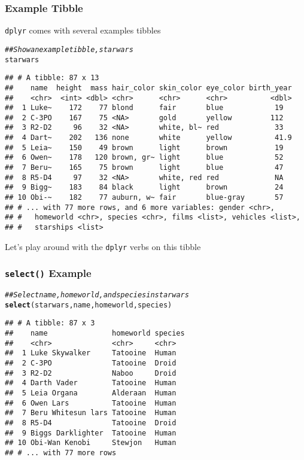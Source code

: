 \documentclass{beamer}\usepackage[]{graphicx}\usepackage[]{color}
\makeatletter
\newcommand{\hlcom}[1]{\textcolor[rgb]{0.678,0.584,0.686}{\textit{#1}}}%
\newcommand{\hlstd}[1]{\textcolor[rgb]{0.345,0.345,0.345}{#1}}%
\newcommand{\hlkwd}[1]{\textcolor[rgb]{0.737,0.353,0.396}{\textbf{#1}}}%
\newenvironment{kframe}{%
 \def\at@end@of@kframe{}%
 \ifinner\ifhmode%
  \def\at@end@of@kframe{\end{minipage}}%
  \begin{minipage}{\columnwidth}%
 \fi\fi%
 \def\FrameCommand##1{\hskip\@totalleftmargin \hskip-\fboxsep
 \colorbox{shadecolor}{##1}\hskip-\fboxsep
     \hskip-\linewidth \hskip-\@totalleftmargin \hskip\columnwidth}%
 \MakeFramed {\advance\hsize-\width
   \@totalleftmargin\z@ \linewidth\hsize
   \@setminipage}}%
 {\par\unskip\endMakeFramed%
 \at@end@of@kframe}
\newenvironment{knitrout}{}{} %
\makeatother
\begin{document}
\begin{frame}[fragile]\frametitle{Example Tibble}
    \texttt{dplyr} comes with several examples tibbles
\begin{knitrout}\footnotesize
{}\color{fgcolor}\begin{kframe}
\begin{alltt}
\hlcom{## Show an example tibble, starwars}
\hlstd{starwars}
\end{alltt}
\begin{verbatim}
## # A tibble: 87 x 13
##    name  height  mass hair_color skin_color eye_color birth_year
##    <chr>  <int> <dbl> <chr>      <chr>      <chr>          <dbl>
##  1 Luke~    172    77 blond      fair       blue            19  
##  2 C-3PO    167    75 <NA>       gold       yellow         112  
##  3 R2-D2     96    32 <NA>       white, bl~ red             33  
##  4 Dart~    202   136 none       white      yellow          41.9
##  5 Leia~    150    49 brown      light      brown           19  
##  6 Owen~    178   120 brown, gr~ light      blue            52  
##  7 Beru~    165    75 brown      light      blue            47  
##  8 R5-D4     97    32 <NA>       white, red red             NA  
##  9 Bigg~    183    84 black      light      brown           24  
## 10 Obi-~    182    77 auburn, w~ fair       blue-gray       57  
## # ... with 77 more rows, and 6 more variables: gender <chr>,
## #   homeworld <chr>, species <chr>, films <list>, vehicles <list>,
## #   starships <list>
\end{verbatim}
\end{kframe}
\end{knitrout}
    \vspace{1ex}
    Let's play around with the \texttt{dplyr} verbs on this tibble
\end{frame}

\begin{frame}[fragile]\frametitle{\texttt{select()} Example}
\begin{knitrout}\footnotesize
{}\color{fgcolor}\begin{kframe}
\begin{alltt}
\hlcom{## Select name, homeworld, and species in starwars}
\hlkwd{select}\hlstd{(starwars, name, homeworld, species)}
\end{alltt}
\begin{verbatim}
## # A tibble: 87 x 3
##    name               homeworld species
##    <chr>              <chr>     <chr>  
##  1 Luke Skywalker     Tatooine  Human  
##  2 C-3PO              Tatooine  Droid  
##  3 R2-D2              Naboo     Droid  
##  4 Darth Vader        Tatooine  Human  
##  5 Leia Organa        Alderaan  Human  
##  6 Owen Lars          Tatooine  Human  
##  7 Beru Whitesun lars Tatooine  Human  
##  8 R5-D4              Tatooine  Droid  
##  9 Biggs Darklighter  Tatooine  Human  
## 10 Obi-Wan Kenobi     Stewjon   Human  
## # ... with 77 more rows
\end{verbatim}
\end{kframe}
\end{knitrout}
\end{frame}
\end{document}
